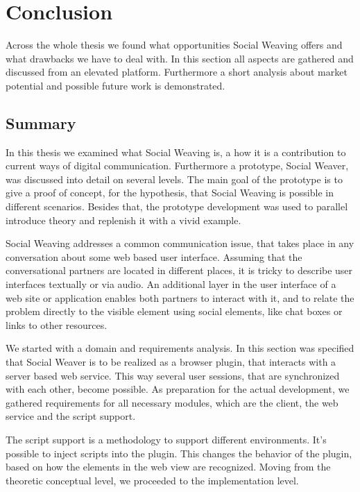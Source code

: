 \section{Conclusion}
Across the whole thesis we found what opportunities Social Weaving offers and what drawbacks we have to deal with. In this section all aspects are gathered and discussed from an elevated platform. 
Furthermore a short analysis about market potential and possible future work is demonstrated. 

\subsection{Summary}

In this thesis we examined what Social Weaving is, a how it is a contribution to current ways of digital communication. Furthermore a prototype, Social Weaver, was discussed into detail on several levels. The main goal of the prototype is to give a proof of concept, for the hypothesis, that Social Weaving is possible in different scenarios. Besides that, the prototype development was used to parallel introduce theory and replenish it with a vivid example. 

Social Weaving addresses a common communication issue, that takes place in any conversation about some web based user interface. Assuming that the conversational partners are located in different places, it is tricky to describe user interfaces textually or via audio. An additional layer in the user interface 
of a web site or application enables both partners to interact with it, and to relate the problem directly to the visible element using social elements, like chat boxes or links to other resources.
 
We started with a domain and requirements analysis. In this section was specified that Social Weaver is to be realized as a browser plugin, that interacts with a server based web service. This way several user sessions, that are synchronized with each other, become possible. As preparation for the actual development, we gathered requirements for all necessary modules, which are the client, the web service and the script support. 

The script support is a methodology to support different environments. It's possible to inject scripts into the plugin. This changes the behavior of the plugin, based on how the elements in the web view are recognized. 
Moving from the theoretic conceptual level, we proceeded to the implementation level. 

